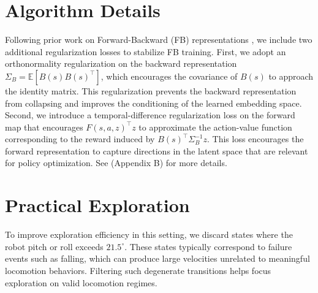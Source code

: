 \beginSupplementaryMaterials

\section{Algorithm Details}
\label{app:fb_algo_details}
Following prior work on Forward-Backward (FB) representations \citep{touati2023does}, we include two additional regularization losses to stabilize FB training. First, we adopt an orthonormality regularization on the backward representation $
\Sigma_B = \mathbb{E}\left[B(s)B(s)^\top\right]$,
which encourages the covariance of $B(s)$ to approach the identity matrix. This regularization prevents the backward representation from collapsing and improves the conditioning of the learned embedding space. Second, we introduce a temporal-difference regularization loss on the forward map that encourages $
F(s,a,z)^\top z
$ to approximate the action-value function corresponding to the reward induced by $B(s)^\top \Sigma_B^{-1}z$. This loss encourages the forward representation to capture directions in the latent space that are relevant for policy optimization. See \citep{touati2023does} (Appendix B) for more details.



\section{Practical Exploration}
\label{appendix:practical-exploration}
To improve exploration efficiency in this setting, we discard states where the robot pitch or roll exceeds $21.5^\circ$. These states typically correspond to failure events such as falling, which can produce large velocities unrelated to meaningful locomotion behaviors. Filtering such degenerate transitions helps focus exploration on valid locomotion regimes.


